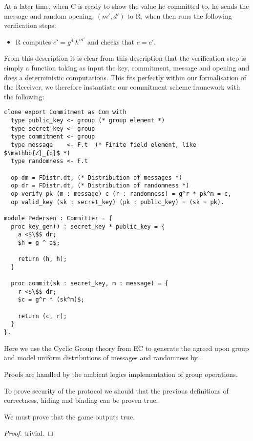 
At a later time, when C is ready to show the value he committed to, he sends the message and random opening, $(m',d')$ to R, when then runs the following verification steps:
\begin{itemize}
  \item R computes $c' = g^{d'}h^{m'}$ and checks that $c = c'$.
\end{itemize}

From this description it is clear from this description that the verification step is simply a function taking as input the key, commitment, message and opening and does a deterministic computations. This fits perfectly within our formalisation of the Receiver, we therefore instantiate our commitment scheme framework with the following:

\begin{lstlisting}[mathescape,label=lst:commitment:pedersen,caption=Pedersen instantiation]
clone export Commitment as Com with
  type public_key <- group (* group element *)
  type secret_key <- group
  type commitment <- group
  type message    <- F.t  (* Finite field element, like $\mathbb{Z}_{q}$ *)
  type randomness <- F.t

  op dm = FDistr.dt, (* Distribution of messages *)
  op dr = FDistr.dt, (* Distribution of randomness *)
  op verify pk (m : message) c (r : randomness) = g^r * pk^m = c,
  op valid_key (sk : secret_key) (pk : public_key) = (sk = pk).

module Pedersen : Committer = {
  proc key_gen() : secret_key * public_key = {
    a <$\$$ dr;
    $h = g ^ a$;

    return (h, h);
  }

  proc commit(sk : secret_key, m : message) = {
    r <$\$$ dr;
    $c = g^r * (sk^m)$;

    return (c, r);
  }
}.

\end{lstlisting}

Here we use the Cyclic Group theory from EC to generate the agreed upon group
and model uniform distributions of messages and randomness by...

Proofs are handled by the ambient logics implementation of group operations.

To prove security of the protocol we should that the previous definitions of
correctness, hiding and binding can be proven true.

\begin{lemma}
  We must prove that the game outputs true.
\end{lemma}
\begin{proof}
trivial.
\end{proof}

